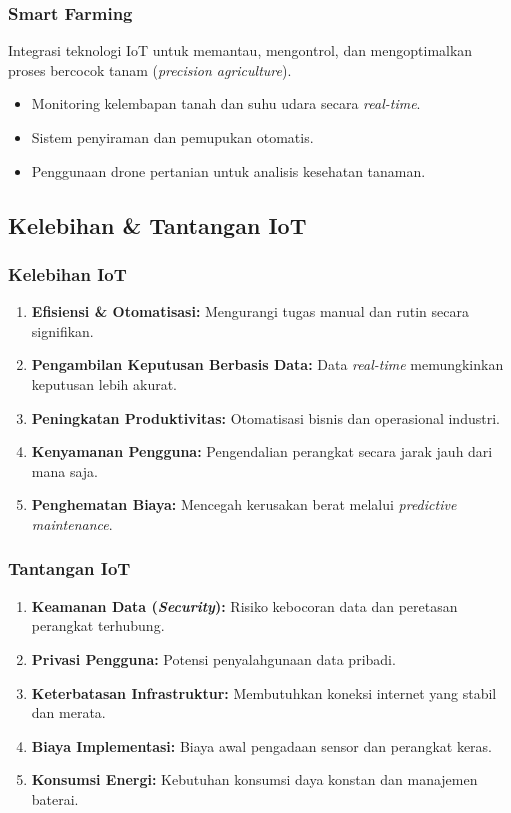 \subsubsection{Smart Farming}
Integrasi teknologi IoT untuk memantau, mengontrol, dan mengoptimalkan proses bercocok tanam (\textit{precision agriculture}).
\begin{itemize}
    \item Monitoring kelembapan tanah dan suhu udara secara \textit{real-time}.
    \item Sistem penyiraman dan pemupukan otomatis.
    \item Penggunaan drone pertanian untuk analisis kesehatan tanaman.
\end{itemize}

\subsection{Kelebihan \& Tantangan IoT}

\subsubsection{Kelebihan IoT}
\begin{enumerate}
    \item \textbf{Efisiensi \& Otomatisasi:} Mengurangi tugas manual dan rutin secara signifikan.
    \item \textbf{Pengambilan Keputusan Berbasis Data:} Data \textit{real-time} memungkinkan keputusan lebih akurat.
    \item \textbf{Peningkatan Produktivitas:} Otomatisasi bisnis dan operasional industri.
    \item \textbf{Kenyamanan Pengguna:} Pengendalian perangkat secara jarak jauh dari mana saja.
    \item \textbf{Penghematan Biaya:} Mencegah kerusakan berat melalui \textit{predictive maintenance}.
\end{enumerate}

\subsubsection{Tantangan IoT}
\begin{enumerate}
    \item \textbf{Keamanan Data (\textit{Security}):} Risiko kebocoran data dan peretasan perangkat terhubung.
    \item \textbf{Privasi Pengguna:} Potensi penyalahgunaan data pribadi.
    \item \textbf{Keterbatasan Infrastruktur:} Membutuhkan koneksi internet yang stabil dan merata.
    \item \textbf{Biaya Implementasi:} Biaya awal pengadaan sensor dan perangkat keras.
    \item \textbf{Konsumsi Energi:} Kebutuhan konsumsi daya konstan dan manajemen baterai.
\end{enumerate}

